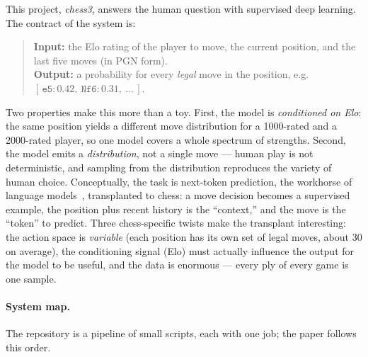 \documentclass[10pt,a4paper]{article}
\begin{document}
This project, \emph{chess3}, answers the human question with supervised
deep learning. The contract of the system is:

\begin{quote}
\textbf{Input:} the Elo rating of the player to move, the current position,
and the last five moves (in PGN form).\\
\textbf{Output:} a probability for every \emph{legal} move in the position,
e.g.\ $[\,\texttt{e5}: 0.42,\ \texttt{Nf6}: 0.31,\ \dots\,]$.
\end{quote}

Two properties make this more than a toy. First, the model is
\emph{conditioned on Elo}: the same position yields a different move
distribution for a 1000-rated and a 2000-rated player, so one model
covers a whole spectrum of strengths. Second, the model emits a
\emph{distribution}, not a single move --- human play is not
deterministic, and sampling from the distribution reproduces the
variety of human choice. Conceptually, the task is next-token
prediction, the workhorse of language models~\cite{gpt2}, transplanted
to chess: a move decision becomes a supervised example, the position
plus recent history is the ``context,'' and the move is the ``token''
to predict. Three chess-specific twists make the transplant interesting:
the action space is \emph{variable} (each position has its own set of
legal moves, about 30 on average), the conditioning signal (Elo) must
actually influence the output for the model to be useful, and the data
is enormous --- every ply of every game is one sample.

\paragraph{System map.} The repository is a pipeline of small scripts, each
with one job; the paper follows this order.
\end{document}
